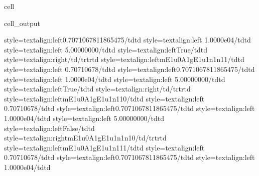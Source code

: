 \documentclass[letterpaper,table,10pt,english]{jupyterBook}
\begin{document}
\begin{sphinxuseclass}{cell}
\begin{sphinxVerbatimOutput}
\begin{sphinxuseclass}{cell_output}
\begin{sphinxVerbatim}[commandchars=\\\{\}]
style=\PYGZbs{}\PYGZsq{}text\PYGZhy{}align:left\PYGZbs{}\PYGZsq{}\PYGZgt{}0.7071067811865475\PYGZlt{}/td\PYGZgt{}\PYGZlt{}td style=\PYGZbs{}\PYGZsq{}text\PYGZhy{}align:left\PYGZbs{}\PYGZsq{}\PYGZgt{} 1.0000e\PYGZhy{}04\PYGZlt{}/td\PYGZgt{}\PYGZlt{}td style=\PYGZbs{}\PYGZsq{}text\PYGZhy{}align:left\PYGZbs{}\PYGZsq{}\PYGZgt{} 5.00000000\PYGZlt{}/td\PYGZgt{}\PYGZlt{}td style=\PYGZbs{}\PYGZsq{}text\PYGZhy{}align:left\PYGZbs{}\PYGZsq{}\PYGZgt{}True\PYGZlt{}/td\PYGZgt{}\PYGZlt{}td style=\PYGZbs{}\PYGZsq{}text\PYGZhy{}align:right\PYGZbs{}\PYGZsq{}\PYGZgt{}\PYGZlt{}/td\PYGZgt{}\PYGZlt{}/tr\PYGZgt{}\PYGZlt{}tr\PYGZgt{}\PYGZlt{}td style=\PYGZbs{}\PYGZsq{}text\PYGZhy{}align:left\PYGZbs{}\PYGZsq{}\PYGZgt{}m\PYGZus{}E1u\PYGZus{}0\PYGZus{}A1g\PYGZus{}E1u\PYGZus{}1\PYGZus{}n1\PYGZus{}n1\PYGZus{}1\PYGZlt{}/td\PYGZgt{}\PYGZlt{}td style=\PYGZbs{}\PYGZsq{}text\PYGZhy{}align:left\PYGZbs{}\PYGZsq{}\PYGZgt{} 0.70710678\PYGZlt{}/td\PYGZgt{}\PYGZlt{}td style=\PYGZbs{}\PYGZsq{}text\PYGZhy{}align:left\PYGZbs{}\PYGZsq{}\PYGZgt{}0.7071067811865475\PYGZlt{}/td\PYGZgt{}\PYGZlt{}td style=\PYGZbs{}\PYGZsq{}text\PYGZhy{}align:left\PYGZbs{}\PYGZsq{}\PYGZgt{} 1.0000e\PYGZhy{}04\PYGZlt{}/td\PYGZgt{}\PYGZlt{}td style=\PYGZbs{}\PYGZsq{}text\PYGZhy{}align:left\PYGZbs{}\PYGZsq{}\PYGZgt{} 5.00000000\PYGZlt{}/td\PYGZgt{}\PYGZlt{}td style=\PYGZbs{}\PYGZsq{}text\PYGZhy{}align:left\PYGZbs{}\PYGZsq{}\PYGZgt{}True\PYGZlt{}/td\PYGZgt{}\PYGZlt{}td style=\PYGZbs{}\PYGZsq{}text\PYGZhy{}align:right\PYGZbs{}\PYGZsq{}\PYGZgt{}\PYGZlt{}/td\PYGZgt{}\PYGZlt{}/tr\PYGZgt{}\PYGZlt{}tr\PYGZgt{}\PYGZlt{}td style=\PYGZbs{}\PYGZsq{}text\PYGZhy{}align:left\PYGZbs{}\PYGZsq{}\PYGZgt{}m\PYGZus{}E1u\PYGZus{}0\PYGZus{}A1g\PYGZus{}E1u\PYGZus{}1\PYGZus{}n1\PYGZus{}1\PYGZus{}0\PYGZlt{}/td\PYGZgt{}\PYGZlt{}td style=\PYGZbs{}\PYGZsq{}text\PYGZhy{}align:left\PYGZbs{}\PYGZsq{}\PYGZgt{} 0.70710678\PYGZlt{}/td\PYGZgt{}\PYGZlt{}td style=\PYGZbs{}\PYGZsq{}text\PYGZhy{}align:left\PYGZbs{}\PYGZsq{}\PYGZgt{}0.7071067811865475\PYGZlt{}/td\PYGZgt{}\PYGZlt{}td style=\PYGZbs{}\PYGZsq{}text\PYGZhy{}align:left\PYGZbs{}\PYGZsq{}\PYGZgt{} 1.0000e\PYGZhy{}04\PYGZlt{}/td\PYGZgt{}\PYGZlt{}td style=\PYGZbs{}\PYGZsq{}text\PYGZhy{}align:left\PYGZbs{}\PYGZsq{}\PYGZgt{} 5.00000000\PYGZlt{}/td\PYGZgt{}\PYGZlt{}td style=\PYGZbs{}\PYGZsq{}text\PYGZhy{}align:left\PYGZbs{}\PYGZsq{}\PYGZgt{}False\PYGZlt{}/td\PYGZgt{}\PYGZlt{}td style=\PYGZbs{}\PYGZsq{}text\PYGZhy{}align:right\PYGZbs{}\PYGZsq{}\PYGZgt{}m\PYGZus{}E1u\PYGZus{}0\PYGZus{}A1g\PYGZus{}E1u\PYGZus{}1\PYGZus{}n1\PYGZus{}n1\PYGZus{}0\PYGZlt{}/td\PYGZgt{}\PYGZlt{}/tr\PYGZgt{}\PYGZlt{}tr\PYGZgt{}\PYGZlt{}td style=\PYGZbs{}\PYGZsq{}text\PYGZhy{}align:left\PYGZbs{}\PYGZsq{}\PYGZgt{}m\PYGZus{}E1u\PYGZus{}0\PYGZus{}A1g\PYGZus{}E1u\PYGZus{}1\PYGZus{}n1\PYGZus{}1\PYGZus{}1\PYGZlt{}/td\PYGZgt{}\PYGZlt{}td style=\PYGZbs{}\PYGZsq{}text\PYGZhy{}align:left\PYGZbs{}\PYGZsq{}\PYGZgt{} 0.70710678\PYGZlt{}/td\PYGZgt{}\PYGZlt{}td style=\PYGZbs{}\PYGZsq{}text\PYGZhy{}align:left\PYGZbs{}\PYGZsq{}\PYGZgt{}0.7071067811865475\PYGZlt{}/td\PYGZgt{}\PYGZlt{}td style=\PYGZbs{}\PYGZsq{}text\PYGZhy{}align:left\PYGZbs{}\PYGZsq{}\PYGZgt{} 1.0000e\PYGZhy{}04\PYGZlt{}/td\PYGZgt{}\PYGZlt{}td 
\end{sphinxVerbatim}
\end{sphinxuseclass}
\end{sphinxVerbatimOutput}
\end{sphinxuseclass}
\end{document}
